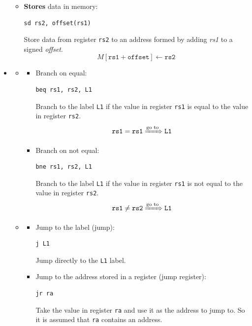 \begin{itemize}
\begin{itemize}
        \item \textbf{Stores} data in memory:
        \begin{lstlisting}[language=riscv]
sd rs2, offset(rs1)\end{lstlisting}
        Store data from register \texttt{rs2} to an address formed by adding \textsl{rs1} to a signed \textsl{offset}.
        \begin{equation*}
            M\left[\texttt{rs1} + \texttt{offset}\right] \leftarrow \texttt{rs2}
        \end{equation*}
    \end{itemize}

    \newpage

    \item {}
    \begin{itemize}
        \item {}
        \begin{itemize}
            \item Branch on equal:
            \begin{lstlisting}[language=riscv]
beq rs1, rs2, L1\end{lstlisting}
            Branch to the label \texttt{L1} if the value in register \texttt{rs1} is equal to the value in register \texttt{rs2}.
            \begin{equation*}
                \texttt{rs1} = \texttt{rs1} \xRightarrow{\text{go to}} \texttt{L1}
            \end{equation*}
            \item Branch on not equal:
            \begin{lstlisting}[language=riscv]
bne rs1, rs2, L1\end{lstlisting}
            Branch to the label \texttt{L1} if the value in register \texttt{rs1} is not equal to the value in register \texttt{rs2}.
            \begin{equation*}
                \texttt{rs1} \ne \texttt{rs2} \xRightarrow{\text{go to}} \texttt{L1}
            \end{equation*}
        \end{itemize}
        \item {}
        \begin{itemize}
            \item Jump to the label (jump):
            \begin{lstlisting}[language=riscv]
j L1\end{lstlisting}
            Jump directly to the \texttt{L1} label.
            \item Jump to the address stored in a register (jump register):
            \begin{lstlisting}[language=riscv]
jr ra\end{lstlisting}
            Take the value in register \texttt{ra} and use it as the address to jump to. So it is assumed that \texttt{ra} contains an address.
        \end{itemize}
    \end{itemize}
\end{itemize}
